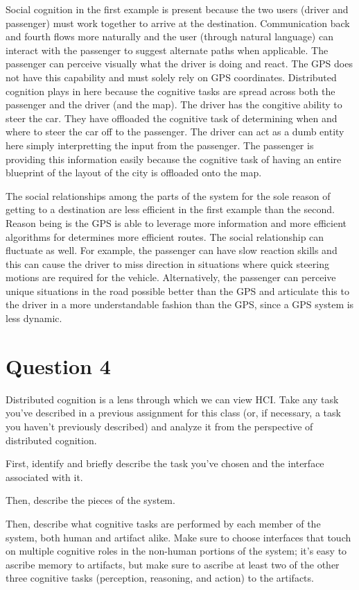 Social cognition in the first example is present because the two users (driver and passenger) must work together to arrive at the destination. Communication back and fourth flows more naturally and the user (through natural language) can interact with the passenger to suggest alternate paths when applicable. The passenger can perceive visually what the driver is doing and react. The GPS does not have this capability and must solely rely on GPS coordinates. Distributed cognition plays in here because the cognitive tasks are spread across both the passenger and the driver (and the map). The driver has the congitive ability to steer the car. They have offloaded the cognitive task of determining when and where to steer the car off to the passenger. The driver can act as a dumb entity here simply interpretting the input from the passenger. The passenger is providing this information easily because the cognitive task of having an entire blueprint of the layout of the city is offloaded onto the map.

The social relationships among the parts of the system for the sole reason of getting to a destination are less efficient in the first example than the second. Reason being is the GPS is able to leverage more information and more efficient algorithms for determines more efficient routes. The social relationship can fluctuate as well. For example, the passenger can have slow reaction skills and this can cause the driver to miss direction in situations where quick steering motions are required for the vehicle. Alternatively, the passenger can perceive unique situations in the road possible better than the GPS and articulate this to the driver in a more understandable fashion than the GPS, since a GPS system is less dynamic.

\section{Question 4}

Distributed cognition is a lens through which we can view HCI. Take any task you’ve described in a previous assignment for this class (or, if necessary, a task you haven’t previously described) and analyze it from the perspective of distributed cognition.

First, identify and briefly describe the task you’ve chosen and the interface associated with it.

Then, describe the pieces of the system.

Then, describe what cognitive tasks are performed by each member of the system, both human and artifact alike. Make sure to choose interfaces that touch on multiple cognitive roles in the non-human portions of the system; it’s easy to ascribe memory to artifacts, but make sure to ascribe at least two of the other three cognitive tasks (perception, reasoning, and action) to the artifacts.


